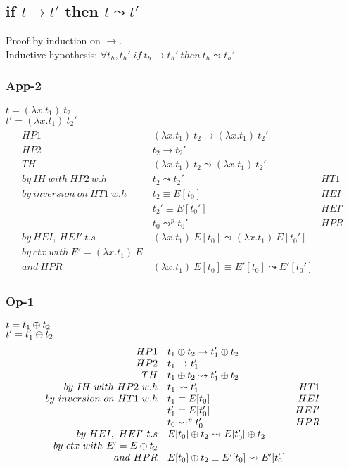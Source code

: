 \documentclass{article}
\newcommand{\bop}[0]{\ensuremath\oplus}
\newcommand{\lam}[2]{\ensuremath{\lambda#1.#2}}
\begin{document}
\subsection{if $t\to t'$ then $t\leadsto t'$}
Proof by induction on $\to$. \\
Inductive hypothesis: $\forall t_h,t_h'. if\ t_h\to t_h'\ then\ t_h\leadsto t_h'$
\subsubsection{App-2}
$t = (\lam{x}{t_1})\ t_2$ \\
$t'= (\lam{x}{t_1})\ t_2'$
\begin{align*}
    \begin{array}{rlr}
        HP1 & (\lam{x}{t_1})\ t_2 \to (\lam{x}{t_1})\ t_2' \\
        HP2 & t_2 \to t_2' \\
        TH  & (\lam{x}{t_1})\ t_2 \leadsto (\lam{x}{t_1})\ t_2' \\
        by\ IH\ with\ HP2\ w.h & t_2\leadsto t_2' & HT1 \\
        by\ inversion\ on\ HT1\ w.h & t_2 \equiv E[t_0] & HEI \\
                                    & t_2'\equiv E[t_0']  & HEI' \\
                                    & t_0 \leadsto^p t_0' & HPR \\
        by\ HEI,\ HEI'\ t.s         & (\lam{x}{t_1})\ E[t_0] \leadsto (\lam{x}{t_1})\ E[t_0'] \\
        by\ ctx\ with\ E' = (\lam{x}{t_1})\ E\ \\
        and\ HPR & (\lam{x}{t_1})\ E[t_0] \equiv E'[t_0]\leadsto E'[t_0']
    \end{array}
\end{align*}

\subsubsection{Op-1}
$t = t_1\bop t_2$ \\
$t'= t_1'\bop t_2$
\begin{align*}
    \begin{array}{rlr}
        HP1 & t_1\bop t_2 \to t_1'\bop t_2 \\
        HP2 & t_1 \to t_1' \\
        TH  & t_1\bop t_2 \leadsto t_1'\bop t_2 \\
        by\ IH\ with\ HP2\ w.h & t_1\leadsto t_1' & HT1 \\
        by\ inversion\ on\ HT1\ w.h & t_1 \equiv E[t_0] & HEI \\
                                    & t_1'\equiv E[t_0']  & HEI' \\
                                    & t_0 \leadsto^p t_0' & HPR \\
        by\ HEI,\ HEI'\ t.s         & E[t_0]\bop t_2 \leadsto E[t_0']\bop t_2 \\
        by\ ctx\ with\ E' = E\bop t_2 \\
        and\ HPR & E[t_0]\bop t_2 \equiv E'[t_0]\leadsto E'[t_0']
    \end{array}
\end{align*}
\end{document}
